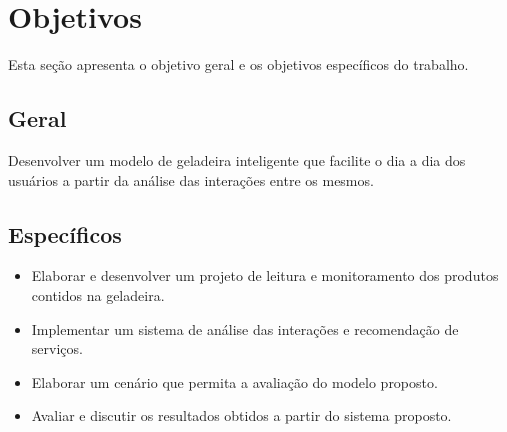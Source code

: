 \section{Objetivos}
Esta seção apresenta o objetivo geral e os objetivos específicos do trabalho.

\subsection{Geral}



Desenvolver um modelo de geladeira inteligente que facilite o dia a dia dos usuários a partir da análise das interações entre os mesmos.
    

\subsection{Específicos}


\begin{itemize} %
	\item Elaborar e desenvolver um projeto de leitura e monitoramento dos produtos contidos na geladeira.
	\item Implementar um sistema de análise das interações e recomendação de serviços.
	\item Elaborar um cenário que permita a avaliação do modelo proposto.
	\item Avaliar e discutir os resultados obtidos a partir do sistema proposto.


\end{itemize}


